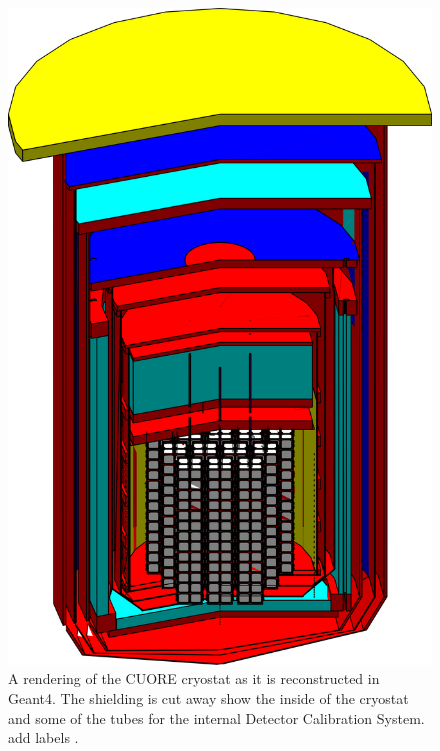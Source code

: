 \begin{figure}[htbp]
    \centering
    \includegraphics[height=0.6\paperheight]{Figures/CUORE_cryostat_MC.png}
    \caption[A rendering of the CUORE crysotat as it is reconstructed in Geant4.]
    {A rendering of the CUORE cryostat as it is reconstructed in Geant4.
    The shielding is cut away show the inside of the cryostat and some of the tubes for the internal Detector Calibration System.
    \color{red} add labels \color{black}.}
    \label{fig:CUORE_cyrostat_MC}
\end{figure}

